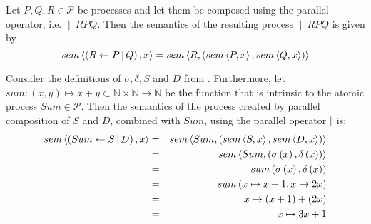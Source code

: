 \begin{definition}
\label{def:sem_parallel}
Let $P, Q, R \in \mathcal{P}$ be processes and let them be composed using the parallel operator, i.e. $\parallel{R}{P}{Q}$. Then the semantics of the resulting process $\parallel{R}{P}{Q}$ is given by %
  \begin{equation}
    \label{eqn:sem_parallel}
    sem \left\langle \left( R \gets P \, | \, Q \right), x \right\rangle = sem \left\langle R, \left( sem \left\langle P, x \right\rangle, sem \left\langle Q, x \right\rangle \right) \right\rangle
  \end{equation}
  \hfill\qedsymbol
\end{definition}


\begin{example}
\label{exp:sem_parallel}
Consider the definitions of $\sigma, \delta, S$ and $D$ from . Furthermore, let $sum \colon \left( x, y \right) \mapsto x + y \subset \mathbb{N} \times \mathbb{N} \to \mathbb{N}$ be the function that is intrinsic to the atomic process $Sum \in \mathcal{P}$. Then the semantics of the process created by parallel composition of $S$ and $D$, combined with $Sum$, using the parallel operator $|$ is: 
  \begin{eqnarray*}
    sem \left\langle \left( Sum \gets S \, | \, D \right), x \right\rangle & = & sem \left\langle Sum, \left( sem \left\langle S, x \right\rangle, sem \left\langle D, x \right\rangle \right) \right\rangle \\
                                  & = & sem \left\langle Sum, \left( \sigma\left(x\right), \delta\left(x\right) \right) \right\rangle \\
                                  & = & sum \left( \sigma\left(x\right), \delta\left(x\right) \right) \\
                                  & = & sum \left( x \mapsto x+1, x \mapsto 2x \right) \\
                                  & = & x \mapsto \left( x+1 \right) + \left( 2x \right) \\
                                  & = & x \mapsto 3x + 1
  \end{eqnarray*}
  \hfill\qedsymbol
\end{example}


